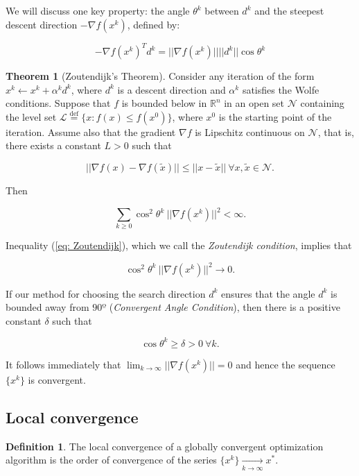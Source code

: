 \documentclass[a4paper, 10pt, twocolumn]{article}
\theoremstyle{definition}
\newtheorem*{defn}{Definition}
\newtheorem{theorem}{Theorem}
\theoremstyle{remark}
\newcommand{\al}{\alpha}
\newcommand{\R}{\mathbb{R}}
\newcommand{\N}{\mathcal{N}}
\begin{document}
We will discuss one key property: the angle $\theta^k$ between $d^k$ and the steepest descent direction $-\nabla f(x^k)$, defined by:

$$
-\nabla f(x^k)^Td^k = || \nabla f(x^k) || || d^k || \cos\theta^k
$$

\begin{theorem}[Zoutendijk's Theorem]
Consider any iteration of the form $x^k \leftarrow x^k + \al^kd^k$, where $d^k$ is a descent direction and $\al^k$ satisfies the Wolfe conditions. Suppose that $f$ is bounded below in $\R^n$ in an open set $\N$ containing the level set $\mathcal{L} \overset{\text{def}}{=}\{ x : f(x) \leq f(x^0)\}$, where $x^0$ is the starting point of the iteration. Assume also that the gradient $\nabla f$ is Lipschitz continuous on $\N$, that is, there exists a constant $L>0$ such that

$$
|| \nabla f(x) - \nabla f(\tilde{x}) || \leq || x-\tilde{x} || \ \forall x, \tilde{x} \in \N.
$$

Then

\begin{equation}\label{eq: Zoutendijk}
\sum_{k \geq 0} \cos^2\theta^k \ ||\nabla f(x^k) ||^2 < \infty.
\end{equation}

\end{theorem}

\newpage

Inequality (\ref{eq: Zoutendijk}), which we call the \textit{Zoutendijk condition}, implies that

$$
\cos^2\theta^k \ ||\nabla f(x^k) ||^2 \rightarrow 0.
$$

If our method for choosing the search direction $d^k$ ensures that the angle $d^k$ is bounded away from $90º$ (\textit{Convergent Angle Condition}), then there is a positive constant $\delta$ such that

$$
\cos\theta^k \geq \delta > 0 \ \forall k.
$$

It follows immediately that $\lim_{k\rightarrow\infty}||\nabla f(x^k)|| = 0$ and hence the sequence $\{ x^k \}$ is convergent.


\subsection{Local convergence}

\begin{defn}
The local convergence of a globally convergent optimization algorithm is the order of convergence of the series $\{x^k\} \underset{k\rightarrow\infty}{\longrightarrow}x^*$.
\end{defn}
\end{document}
